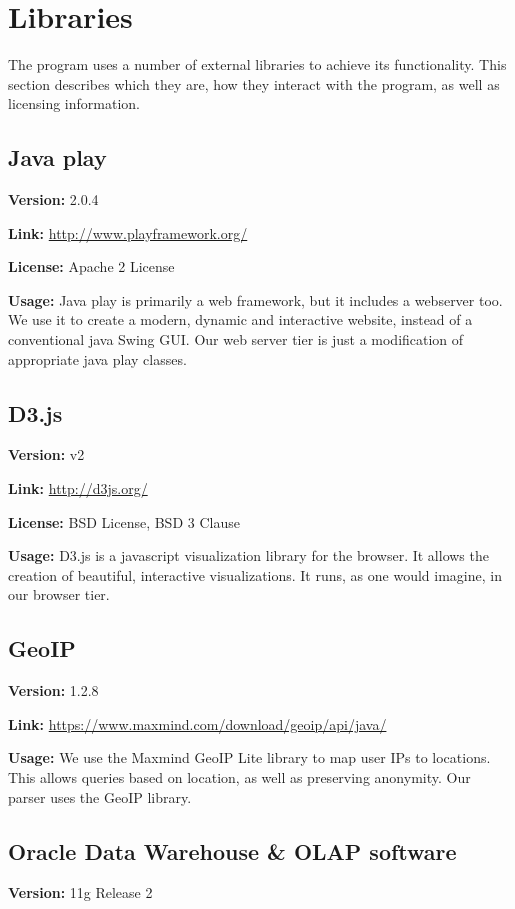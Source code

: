 \section{Libraries}

The program uses a number of external libraries to achieve its functionality. This section describes which they are,
how they interact with the program, as well as licensing information. 

\subsection{Java play}
\textbf{Version:} 2.0.4

\textbf{Link:} \url{http://www.playframework.org/}

\textbf{License:} Apache 2 License

\textbf{Usage:} 
Java play is primarily a web framework, but it includes a webserver too.
We use it to create a modern, dynamic and interactive website, instead of a conventional java Swing GUI.
Our web server tier is just a modification of appropriate java play classes.

\subsection{D3.js}
\textbf{Version:} v2

\textbf{Link:} \url{http://d3js.org/} 

\textbf{License:} BSD License, BSD 3 Clause


\textbf{Usage:} 
D3.js is a javascript visualization library for the browser.
It allows the creation of beautiful, interactive visualizations.
It runs, as one would imagine, in our browser tier.


\subsection{GeoIP}\label{geo}

\textbf{Version:} 1.2.8

\textbf{Link:} \url{https://www.maxmind.com/download/geoip/api/java/}

\textbf{Usage:} 
We use the Maxmind GeoIP Lite library to map user IPs to locations.
This allows queries based on location, as well as preserving anonymity.
Our parser uses the GeoIP library.


\subsection{Oracle Data Warehouse \& OLAP software}
\textbf{Version:} 11g Release 2

